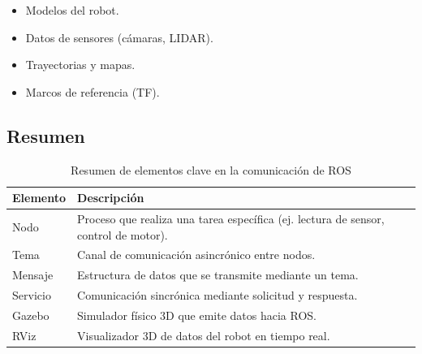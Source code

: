 \begin{itemize}
	\item Modelos del robot.
	\item Datos de sensores (cámaras, LIDAR).
	\item Trayectorias y mapas.
	\item Marcos de referencia (TF).
\end{itemize}


\subsection*{Resumen}
\begin{table}[H]
	\centering
	\begin{tabular}{|l|p{10cm}|}
		\hline
		\textbf{Elemento} & \textbf{Descripción} \\
		\hline
		Nodo & Proceso que realiza una tarea específica (ej. lectura de sensor, control de motor). \\
		Tema & Canal de comunicación asincrónico entre nodos. \\
		Mensaje & Estructura de datos que se transmite mediante un tema. \\
		Servicio & Comunicación sincrónica mediante solicitud y respuesta. \\
		Gazebo & Simulador físico 3D que emite datos hacia ROS. \\
		RViz & Visualizador 3D de datos del robot en tiempo real. \\
		\hline
	\end{tabular}
	\caption{Resumen de elementos clave en la comunicación de ROS}
\end{table}
